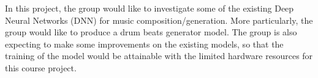 \begin{par}
    \par \hspace{15pt} In this project, the group would like to investigate some of the existing Deep Neural Networks (DNN) for music composition/generation. More particularly, the group would like to produce a drum beats generator model. The group is also expecting to make some improvements on the existing models, so that the training of the model would be attainable with the limited hardware resources for this course project.  
\end{par}